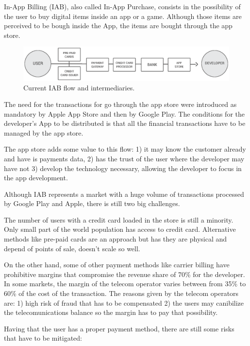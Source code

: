 
In-App Billing (IAB), also called In-App Purchase, consists in the possibility of the user to buy digital items inside an app or a game. Although those items are perceived to be bough inside the App, the items are bought through the app store.

\begin{figure}[!ht]
\centering
\includegraphics[width=\textwidth]{diagrams/iab_flow.eps}
\caption{Current IAB flow and intermediaries.}
\label{fig:iab_flow}
\end{figure}


The need for the transactions for go through the app store were introduced as mandatory by Apple App Store and then by Google Play. The conditions for the developer's App to be distributed is that all the financial transactions have to be managed by the app store. 

The app store adds some value to this flow: 1) it may know the customer already and have is payments data, 2) has the trust of the user where the developer may have not 3) develop the technology necessary, allowing the developer to focus in the app development.

Although IAB represents a market with a huge volume of transactions processed by Google Play and Apple, there is still two big challenges.

The number of users with a credit card loaded in the store is still a minority. Only small part of the world population has access to credit card. Alternative methods like pre-paid cards are an approach but has they are physical and depend of points of sale, doesn't scale so well.

On the other hand, some of other payment methods like carrier billing have prohibitive margins that compromise the revenue share of 70\% for the developer. In some markets, the margin of the telecom operator varies between from 35\% to 60\% of the cost of the transaction. The reasons given by the telecom operators are: 1) high risk of fraud that has to be compensated 2) the users may canibilize the telecomunications balance so the margin has to pay that possibility.

Having that the user has a proper payment method, there are still some risks that have to be mitigated:

